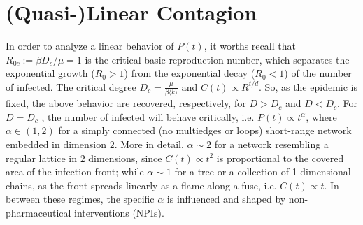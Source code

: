\documentclass[a4paper,12pt,twoside]{book} %
\theoremstyle{definition}
\begin{document}
\section*{(Quasi-)Linear Contagion}
In order to analyze a linear behavior of $P(t)$, it worths recall that $R_{0c} := \beta D_c / \mu = 1$ is the critical basic reproduction number, which separates the exponential growth ($R_0 > 1$) from the exponential decay ($R_0 < 1$) of the number of infected. The critical degree $D_c = \frac{\mu}{\beta \langle k \rangle}$ and $C(t) \propto R^{t/d}$. So, as the epidemic is fixed, the above behavior are recovered, respectively, for $D > D_c$ and $D<D_c$. For $D=D_c$ \cite{Thurner::NetBasedExpl}, the number of infected will behave critically, i.e. $P(t) \propto t^{\alpha}$, where $\alpha \in (1,2)$ for a simply connected (no multiedges or loops) short-range network embedded in dimension $2$. More in detail, $\alpha \sim 2$ for a network resembling a regular lattice in $2$ dimensions, since $C(t) \propto t^2$ is proportional to the covered area of the infection front; while $\alpha \sim 1$ for a tree or a collection of 1-dimensional chains, as the front spreads linearly as a flame along a fuse, i.e. $C(t) \propto t$. In between these regimes, the specific $\alpha$ is influenced and shaped by non-pharmaceutical interventions (NPIs).
\end{document}
